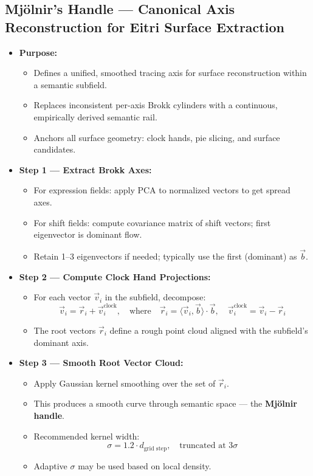 \documentclass{article}
\begin{document}
\subsection{Mjölnir's Handle — Canonical Axis Reconstruction for Eitri Surface Extraction}

\begin{itemize}
  \item \textbf{Purpose:}
    \begin{itemize}
      \item Defines a unified, smoothed tracing axis for surface reconstruction within a semantic subfield.
      \item Replaces inconsistent per-axis Brokk cylinders with a continuous, empirically derived semantic rail.
      \item Anchors all surface geometry: clock hands, pie slicing, and surface candidates.
    \end{itemize}

  \item \textbf{Step 1 — Extract Brokk Axes:}
    \begin{itemize}
      \item For expression fields: apply PCA to normalized vectors to get spread axes.
      \item For shift fields: compute covariance matrix of shift vectors; first eigenvector is dominant flow.
      \item Retain 1–3 eigenvectors if needed; typically use the first (dominant) as $\vec{b}$.
    \end{itemize}

  \item \textbf{Step 2 — Compute Clock Hand Projections:}
    \begin{itemize}
      \item For each vector $\vec{v}_i$ in the subfield, decompose:
        \[
        \vec{v}_i = \vec{r}_i + \vec{v}_i^{\text{clock}}, \quad \text{where} \quad
        \vec{r}_i = \langle \vec{v}_i, \vec{b} \rangle \cdot \vec{b}, \quad
        \vec{v}_i^{\text{clock}} = \vec{v}_i - \vec{r}_i
        \]
      \item The root vectors $\vec{r}_i$ define a rough point cloud aligned with the subfield's dominant axis.
    \end{itemize}

  \item \textbf{Step 3 — Smooth Root Vector Cloud:}
    \begin{itemize}
      \item Apply Gaussian kernel smoothing over the set of $\vec{r}_i$.
      \item This produces a smooth curve through semantic space — the \textbf{Mjölnir handle}.
      \item Recommended kernel width:
        \[
        \sigma = 1.2 \cdot d_{\text{grid step}}, \quad \text{truncated at } 3\sigma
        \]
      \item Adaptive $\sigma$ may be used based on local density.
    \end{itemize}


\end{itemize}
\end{document}

